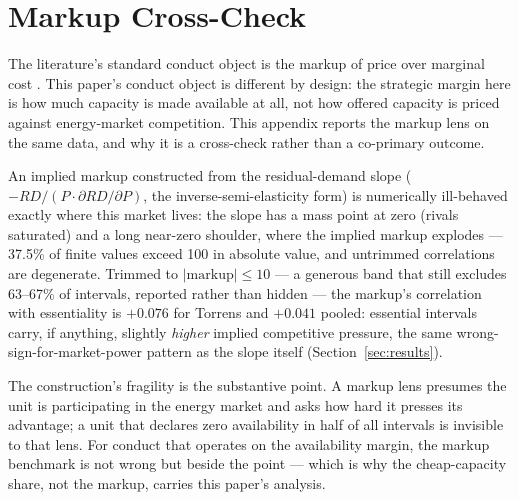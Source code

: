 \section{Markup Cross-Check}\label{app:markup}

The literature's standard conduct object is the markup of price over marginal
cost \citep{Wolfram1999_duopoly, BorensteinBushnellWolak2002_california,
HortacsuPuller2008_ercot}. This paper's conduct object is different by
design: the strategic margin here is how much capacity is made available at
all, not how offered capacity is priced against energy-market competition.
This appendix reports the markup lens on the same data, and why it is a
cross-check rather than a co-primary outcome.

An implied markup constructed from the residual-demand slope
($-RD/(P \cdot \partial RD/\partial P)$, the inverse-semi-elasticity form)
is numerically ill-behaved exactly where this market lives: the slope has a
mass point at zero (rivals saturated) and a long near-zero shoulder, where the
implied markup explodes --- 37.5\% of finite values exceed 100 in absolute
value, and untrimmed correlations are degenerate. Trimmed to
$|\text{markup}| \leq 10$ --- a generous band that still excludes 63--67\% of
intervals, reported rather than hidden --- the markup's correlation with
essentiality is $+0.076$ for Torrens and $+0.041$ pooled: essential intervals
carry, if anything, slightly \emph{higher} implied competitive pressure, the
same wrong-sign-for-market-power pattern as the slope itself
(Section~\ref{sec:results}).

The construction's fragility is the substantive point. A markup lens presumes
the unit is participating in the energy market and asks how hard it presses
its advantage; a unit that declares zero availability in half of all
intervals is invisible to that lens. For conduct that operates on the
availability margin, the markup benchmark is not wrong but beside the point
--- which is why the cheap-capacity share, not the markup, carries this
paper's analysis.
